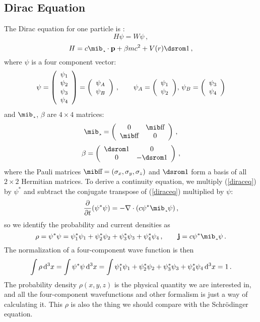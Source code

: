 \subsection{Dirac Equation}

The Dirac equation for one particle is \cite{strange,zabloudil}: 
\begin{equation}
  H\psi=W\psi\,,  \label{diraceq}
\end{equation}
\begin{equation*}
  H=c\balpha\cdot{\bf p}+\beta mc^2+V(r)\hbox{\dsrom1}\,,
\end{equation*}
where $\psi$ is a four component vector: 
\begin{equation*}
  \psi=\left(
\begin{array}{c}
\psi_1\\
\psi_2\\
\psi_3\\
\psi_4\\
\end{array}
\right) =\left(\begin{array}{c} \psi_A\\ \psi_B\\ \end{array}\right)\,,\qquad \psi_A=\left(\begin{array}{c} \psi_1\\ \psi_2\\ \end{array}\right)\!,\,\psi_B=\left(\begin{array}{c} \psi_3\\ \psi_4\\ \end{array}\right)
\end{equation*}
and $\balpha$, $\beta$ are $4\times4$ matrices: 
\begin{equation*}
  \balpha=\mat{0}{\bsigma}{\bsigma}{0}\,,
\end{equation*}
\begin{equation*}
  \beta=\mat{\hbox{\dsrom1}}{0}{0}{-\hbox{\dsrom1}}\,,
\end{equation*}
where the Pauli matrices $\bsigma=(\sigma_x,\sigma_y,\sigma_z)$ and $\hbox{\dsrom1}$ form a basis of all $2\times2$ Hermitian matrices. To derive a continuity equation, we multiply (\ref{diraceq}) by $\psi^*$ and subtract the conjugate transpose of (\ref{diraceq}) multiplied by $\psi$: 
\begin{equation*}
  \p{}{t}(\psi^*\psi)=-\nabla\cdot(c\psi^*\balpha\psi)\,,
\end{equation*}
so we identify the probability and current densities as 
\begin{equation*}
  \rho=\psi^*\psi=\psi_1^*\psi_1+\psi_2^*\psi_2+\psi_3^*\psi_3+\psi_4^*\psi_4\,, \qquad {\bf j}=c\psi^*\balpha\psi\,.
\end{equation*}
The normalization of a four-component wave function is then 
\begin{equation}
  \int \rho \,{\rm d}^3x= \int \psi^*\psi \,{\rm d}^3x= \int \psi_1^*\psi_1+\psi_2^*\psi_2+\psi_3^*\psi_3+\psi_4^*\psi_4 \,{\rm d}^3x= 1\,.  \label{norm}
\end{equation}
The probability density $\rho(x,y,z)$ is the physical quantity we are interested in, and all the four-component wavefunctions and other formalism is just a way of calculating it. This $\rho$ is also the thing we should compare with the Schrödinger equation.


